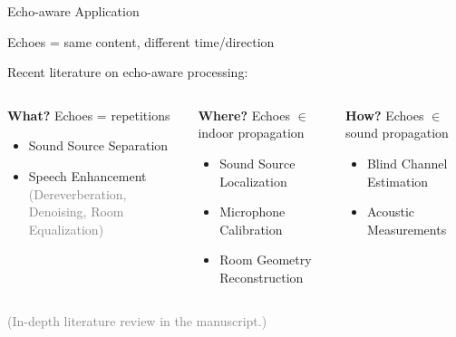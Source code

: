 \begin{frame}{Echo-aware Application}

    \begin{block}{Echoes = same content, different time/direction}
        \centering
    \end{block}


    Recent literature on echo-aware processing:
    \begin{columns}[T,onlytextwidth]
        \begin{block}{\textbf{What?}}
            \small
            Echoes = repetitions
            \begin{itemize}
                \item Sound Source Separation
                \item Speech Enhancement
                \\\textcolor{gray}{\footnotesize(Dereverberation, Denoising, Room Equalization)}
            \end{itemize}
        \end{block}

        \begin{block}{\textbf{Where?}}
            \small
            Echoes $\in$ indoor propagation
            \begin{itemize}
                \item Sound Source Localization
                \item Microphone Calibration
                \item Room Geometry Reconstruction
            \end{itemize}
        \end{block}

        \begin{block}{\textbf{How?}}
            \small
            Echoes $\in$ sound propagation
            \begin{itemize}
                \item Blind Channel Estimation
                \item Acoustic Measurements
            \end{itemize}
        \end{block}
    \end{columns}

    \begin{center}
        \textcolor{gray}{\small (In-depth literature review in the manuscript.)}
    \end{center}
\end{frame}

